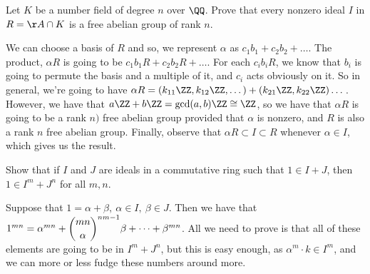 \begin{problem}
Let \(K\) be a number field of degree \(n\) over \(\QQ\). Prove that every nonzero ideal \(I\) in \(R = \AA \cap K\) is a free abelian group of rank \(n\).
\end{problem}
We can choose a basis of \(R\) and so, we represent \(\alpha\) as \(c_1b_1+c_2b_2+ \dots\). The product, \(\alpha R\) is going to be \(c_1b_1R+c_2b_2R+\dots\). For each \(c_ib_iR\), we know that \(b_i\) is going to permute the basis and a multiple of it, and \(c_i\) acts obviously on it. So in general, we're going to have \(\alpha R = (k_{11}\ZZ,k_{12}\ZZ,\dots) + (k_{21}\ZZ,k_{22}\ZZ)\dots\). However, we have that \(a\ZZ+b\ZZ = \gcd(a,b)\ZZ \cong \ZZ\), so we have that \(\alpha R\) is going to be a rank \(n)\) free abelian group provided that \(\alpha\) is nonzero, and \(R\) is also a rank \(n\) free abelian group. Finally, observe that \(\alpha R \subset I \subset R\) whenever \(\alpha \in I\), which gives us the result.

\begin{problem}
Show that if \(I\) and \(J\) are ideals in a commutative ring such that \(1 \in I+J\), then \(1 \in I^m+J^n\) for all \(m,n\).
\end{problem}
Suppose that \(1=\alpha+\beta, \ \alpha \in I, \ \beta \in J\). Then we have that \(1^{mn}=\alpha^{mn}+\dbinom{mn}\alpha^{nm-1}\beta+ \dots + \beta^{mn}\). All we need to prove is that all of these elements are going to be in \(I^m+J^n\), but this is easy enough, as \(\alpha^m \cdot k \in I^m\), and we can more or less fudge these numbers around more.

